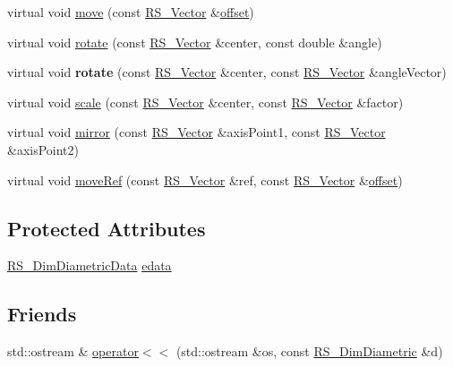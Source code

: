 \begin{DoxyCompactItemize}
\item 
virtual void \hyperlink{classRS__DimDiametric_a92c9b9fdd3eddd2acaaafc6ea0fd5955}{move} (const \hyperlink{classRS__Vector}{R\-S\-\_\-\-Vector} \&\hyperlink{classRS__Entity_aa296d21b9aac99161d386ce2f60f0fea}{offset})
\item 
virtual void \hyperlink{classRS__DimDiametric_afda5778f3a1b2b9c064d50c1744ad84a}{rotate} (const \hyperlink{classRS__Vector}{R\-S\-\_\-\-Vector} \&center, const double \&angle)
\item 
\hypertarget{classRS__DimDiametric_aad604ca1ad6f56eaa6d609e8ac671361}{virtual void {\bfseries rotate} (const \hyperlink{classRS__Vector}{R\-S\-\_\-\-Vector} \&center, const \hyperlink{classRS__Vector}{R\-S\-\_\-\-Vector} \&angle\-Vector)}\label{classRS__DimDiametric_aad604ca1ad6f56eaa6d609e8ac671361}

\item 
virtual void \hyperlink{classRS__DimDiametric_ac0cfd9dd0dc128a26132343e07926610}{scale} (const \hyperlink{classRS__Vector}{R\-S\-\_\-\-Vector} \&center, const \hyperlink{classRS__Vector}{R\-S\-\_\-\-Vector} \&factor)
\item 
virtual void \hyperlink{classRS__DimDiametric_ab4b37ca858cf8e81df9cb5e832f15277}{mirror} (const \hyperlink{classRS__Vector}{R\-S\-\_\-\-Vector} \&axis\-Point1, const \hyperlink{classRS__Vector}{R\-S\-\_\-\-Vector} \&axis\-Point2)
\item 
virtual void \hyperlink{classRS__DimDiametric_a4ef758922f35bbbfe3b4a193d619f72d}{move\-Ref} (const \hyperlink{classRS__Vector}{R\-S\-\_\-\-Vector} \&ref, const \hyperlink{classRS__Vector}{R\-S\-\_\-\-Vector} \&\hyperlink{classRS__Entity_aa296d21b9aac99161d386ce2f60f0fea}{offset})
\end{DoxyCompactItemize}
\subsection*{Protected Attributes}
\begin{DoxyCompactItemize}
\item 
\hyperlink{classRS__DimDiametricData}{R\-S\-\_\-\-Dim\-Diametric\-Data} \hyperlink{classRS__DimDiametric_ab9ac641aca6e2777516d841eba663bc1}{edata}
\end{DoxyCompactItemize}
\subsection*{Friends}
\begin{DoxyCompactItemize}
\item 
std\-::ostream \& \hyperlink{classRS__DimDiametric_a22c360f63f74a7737c1b2b77639e4d7f}{operator$<$$<$} (std\-::ostream \&os, const \hyperlink{classRS__DimDiametric}{R\-S\-\_\-\-Dim\-Diametric} \&d)
\end{DoxyCompactItemize}
